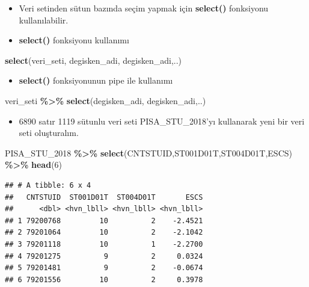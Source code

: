 \documentclass[
  oneside]{book}
\newenvironment{Shaded}{\begin{snugshade}}{\end{snugshade}}
\newcommand{\DecValTok}[1]{\textcolor[rgb]{0.00,0.00,0.81}{#1}}
\newcommand{\FunctionTok}[1]{\textcolor[rgb]{0.13,0.29,0.53}{\textbf{#1}}}
\newcommand{\NormalTok}[1]{#1}
\newcommand{\SpecialCharTok}[1]{\textcolor[rgb]{0.81,0.36,0.00}{\textbf{#1}}}
\providecommand{\tightlist}{%
  \setlength{\itemsep}{0pt}\setlength{\parskip}{0pt}}
\begin{document}
\begin{itemize}
\item
  Veri setinden sütun bazında seçim yapmak için \textbf{select()} fonksiyonu kullanılabilir.
\item
  \textbf{select()} fonksiyonu kullanımı
\end{itemize}

\begin{Shaded}
\begin{Highlighting}[]
\FunctionTok{select}\NormalTok{(veri\_seti, degisken\_adi, degisken\_adi,..)}
\end{Highlighting}
\end{Shaded}

\begin{itemize}
\tightlist
\item
  \textbf{select()} fonksiyonunun pipe ile kullanımı
\end{itemize}

\begin{Shaded}
\begin{Highlighting}[]
\NormalTok{veri\_seti }\SpecialCharTok{\%\textgreater{}\%} \FunctionTok{select}\NormalTok{(degisken\_adi, degisken\_adi,..)}
\end{Highlighting}
\end{Shaded}

\begin{itemize}
\tightlist
\item
  6890 satır 1119 sütunlu veri seti
  PISA\_STU\_2018'yı kullanarak yeni bir veri seti oluşturalım.
\end{itemize}

\begin{Shaded}
\begin{Highlighting}[]
\NormalTok{PISA\_STU\_2018 }\SpecialCharTok{\%\textgreater{}\%} \FunctionTok{select}\NormalTok{(CNTSTUID,ST001D01T,ST004D01T,ESCS) }\SpecialCharTok{\%\textgreater{}\%}
\FunctionTok{head}\NormalTok{(}\DecValTok{6}\NormalTok{)}
\end{Highlighting}
\end{Shaded}

\begin{verbatim}
## # A tibble: 6 x 4
##   CNTSTUID  ST001D01T  ST004D01T       ESCS
##      <dbl> <hvn_lbll> <hvn_lbll> <hvn_lbll>
## 1 79200768         10          2    -2.4521
## 2 79201064         10          2    -2.1042
## 3 79201118         10          1    -2.2700
## 4 79201275          9          2     0.0324
## 5 79201481          9          2    -0.0674
## 6 79201556         10          2     0.3978
\end{verbatim}
\end{document}

